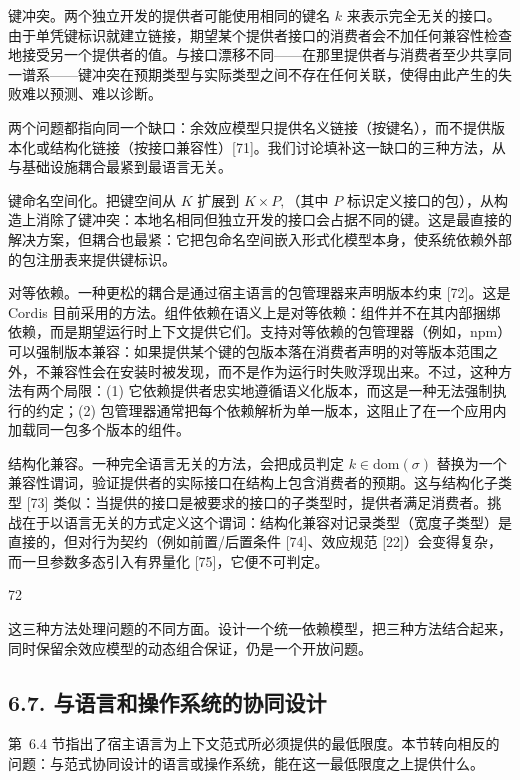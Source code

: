 键冲突。两个独立开发的提供者可能使用相同的键名 \(k\) 来表示完全无关的接口。由于单凭键标识就建立链接，期望某个提供者接口的消费者会不加任何兼容性检查地接受另一个提供者的值。与接口漂移不同——在那里提供者与消费者至少共享同一谱系——键冲突在预期类型与实际类型之间不存在任何关联，使得由此产生的失败难以预测、难以诊断。

两个问题都指向同一个缺口：余效应模型只提供名义链接（按键名），而不提供版本化或结构化链接（按接口兼容性）{[}71{]}。我们讨论填补这一缺口的三种方法，从与基础设施耦合最紧到最语言无关。

键命名空间化。把键空间从 \(K\) 扩展到 \(K \times P ,\)（其中 \(P\) 标识定义接口的包），从构造上消除了键冲突：本地名相同但独立开发的接口会占据不同的键。这是最直接的解决方案，但耦合也最紧：它把包命名空间嵌入形式化模型本身，使系统依赖外部的包注册表来提供键标识。

对等依赖。一种更松的耦合是通过宿主语言的包管理器来声明版本约束 {[}72{]}。这是 Cordis 目前采用的方法。组件依赖在语义上是对等依赖：组件并不在其内部捆绑依赖，而是期望运行时上下文提供它们。支持对等依赖的包管理器（例如，npm）可以强制版本兼容：如果提供某个键的包版本落在消费者声明的对等版本范围之外，不兼容性会在安装时被发现，而不是作为运行时失败浮现出来。不过，这种方法有两个局限：(1) 它依赖提供者忠实地遵循语义化版本，而这是一种无法强制执行的约定；(2) 包管理器通常把每个依赖解析为单一版本，这阻止了在一个应用内加载同一包多个版本的组件。

结构化兼容。一种完全语言无关的方法，会把成员判定 \(k \in \mathrm { d o m } ( \sigma )\) 替换为一个兼容性谓词，验证提供者的实际接口在结构上包含消费者的预期。这与结构化子类型 {[}73{]} 类似：当提供的接口是被要求的接口的子类型时，提供者满足消费者。挑战在于以语言无关的方式定义这个谓词：结构化兼容对记录类型（宽度子类型）是直接的，但对行为契约（例如前置/后置条件 {[}74{]}、效应规范 {[}22{]}）会变得复杂，而一旦参数多态引入有界量化 {[}75{]}，它便不可判定。

72

这三种方法处理问题的不同方面。设计一个统一依赖模型，把三种方法结合起来，同时保留余效应模型的动态组合保证，仍是一个开放问题。

\subsection{6.7. 与语言和操作系统的协同设计}\label{co-design-with-languages-and-operating-systems}

第~6.4 节指出了宿主语言为上下文范式所必须提供的最低限度。本节转向相反的问题：与范式协同设计的语言或操作系统，能在这一最低限度之上提供什么。

